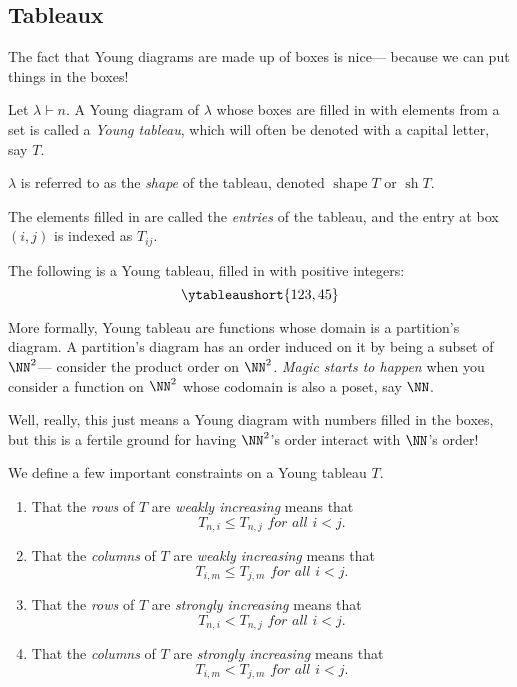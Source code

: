 \documentclass{article}
\DeclareMathOperator{\shape}{shape}
\DeclareMathOperator{\sh}{sh}
\begin{document}
\subsection{Tableaux}

The fact that Young diagrams are made up of boxes is nice--- because we can put things in the boxes! 

\begin{definition}
    Let $\lambda \vdash n$. A Young diagram of $\lambda$ whose boxes are filled in with elements from a set is called a \textit{Young tableau}, which will often be denoted with a capital letter, say $T$. 

    $\lambda$ is referred to as the \textit{shape} of the tableau, denoted $\shape T$ or $\sh T$.

    The elements filled in are called the \textit{entries} of the tableau, and the entry at box $(i,j)$ is indexed as $T_{ij}$.
\end{definition}

\begin{example}
    The following is a Young tableau, filled in with positive integers:
    \[
        \ytableaushort{123,45}
    \]
\end{example}

More formally, Young tableau are functions whose domain is a partition's diagram.
A partition's diagram has an order induced on it by being a subset of $\NN^2$--- consider the product order on $\NN^2$. 
\textit{Magic starts to happen} when you consider a function on $\NN^2$ whose codomain is also a poset, say $\NN$.

Well, really, this just means a Young diagram with numbers filled in the boxes, but this is a fertile ground for having $\NN^2$'s order interact with $\NN$'s order!

\begin{definition}
    We define a few important constraints on a Young tableau $T$.
    \begin{enumerate}[label=(\alph*)]
        \item That the \textit{rows} of $T$ are \textit{weakly increasing} means that
            \[
                T_{n,i} \leq T_{n,j} \textit{ for all } i < j.
            \]
        \item That the \textit{columns} of $T$ are \textit{weakly increasing} means that
            \[
                T_{i,m} \leq T_{j,m} \textit{ for all } i < j.
            \]
        \item That the \textit{rows} of $T$ are \textit{strongly increasing} means that
            \[
                T_{n,i} < T_{n,j} \textit{ for all } i < j.
            \]
        \item That the \textit{columns} of $T$ are \textit{strongly increasing} means that
            \[
                T_{i,m} < T_{j,m} \textit{ for all } i < j.
            \]
    \end{enumerate}
\end{definition} 
\end{document}
